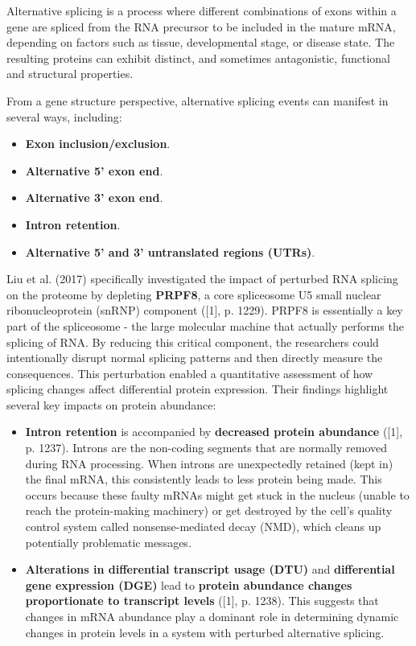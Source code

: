 \documentclass[12pt,a4paper]{article}
\begin{document}
Alternative splicing is a process where different combinations of exons within a gene are spliced from the RNA precursor to be included in the mature mRNA, depending on factors such as tissue, developmental stage, or disease state. The resulting proteins can exhibit distinct, and sometimes antagonistic, functional and structural properties.

From a gene structure perspective, alternative splicing events can manifest in several ways, including:
\begin{itemize}
    \item \textbf{Exon inclusion/exclusion}.
    \item \textbf{Alternative 5' exon end}.
    \item \textbf{Alternative 3' exon end}.
    \item \textbf{Intron retention}.
    \item \textbf{Alternative 5' and 3' untranslated regions (UTRs)}.
\end{itemize}

Liu et al. (2017) specifically investigated the impact of perturbed RNA splicing on the proteome by depleting \textbf{PRPF8}, a core spliceosome U5 small nuclear ribonucleoprotein (snRNP) component ([1], p. 1229). PRPF8 is essentially a key part of the spliceosome - the large molecular machine that actually performs the splicing of RNA. By reducing this critical component, the researchers could intentionally disrupt normal splicing patterns and then directly measure the consequences. This perturbation enabled a quantitative assessment of how splicing changes affect differential protein expression. Their findings highlight several key impacts on protein abundance:
\begin{itemize}
    \item \textbf{Intron retention} is accompanied by \textbf{decreased protein abundance} ([1], p. 1237). Introns are the non-coding segments that are normally removed during RNA processing. When introns are unexpectedly retained (kept in) the final mRNA, this consistently leads to less protein being made. This occurs because these faulty mRNAs might get stuck in the nucleus (unable to reach the protein-making machinery) or get destroyed by the cell's quality control system called nonsense-mediated decay (NMD), which cleans up potentially problematic messages.
    \item \textbf{Alterations in differential transcript usage (DTU)} and \textbf{differential gene expression (DGE)} lead to \textbf{protein abundance changes proportionate to transcript levels} ([1], p. 1238). This suggests that changes in mRNA abundance play a dominant role in determining dynamic changes in protein levels in a system with perturbed alternative splicing.
\end{itemize}
\end{document}
